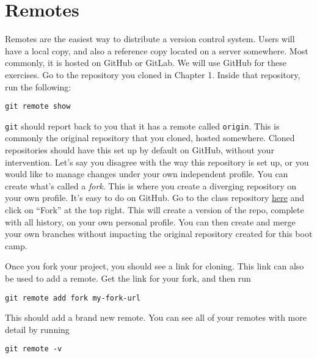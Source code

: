 \section{Remotes}
\par{
Remotes are the easiest way to distribute a version control system. Users will
have a local copy, and also a reference copy located on a server somewhere.
Most commonly, it is hosted on GitHub or GitLab. We will use GitHub for these
exercises. Go to the repository you cloned in Chapter 1. Inside that
repository, run the following:
}

\begin{verbatim}
git remote show
\end{verbatim}

\par{
\verb+git+ should report back to you that it has a remote called
\verb+origin+. This is commonly the original repository that you cloned,
hosted somewhere. Cloned repositories should have this set up by default on
GitHub, without your intervention. Let's say you disagree with the way this
repository is set up, or you would like to manage changes under your own
independent profile. You can create what's called a \emph{fork}. This is where
you create a diverging repository on your own profile. It's easy to do on
GitHub. Go to the class repository
\href{https://github.com/jbteves/test_git}{here} and click on ``Fork'' at the
top right. This will create a version of the repo, complete with all history,
on your own personal profile. You can then create and merge your own branches
without impacting the original repository created for this boot camp. 
}

\par{
Once you fork your project, you should see a link for cloning. This link can
also be used to add a remote. Get the link for your fork, and then run
}

\begin{verbatim}
git remote add fork my-fork-url
\end{verbatim}

\par{
This should add a brand new remote. You can see all of your remotes with more
detail by running 
}

\begin{verbatim}
git remote -v
\end{verbatim}

